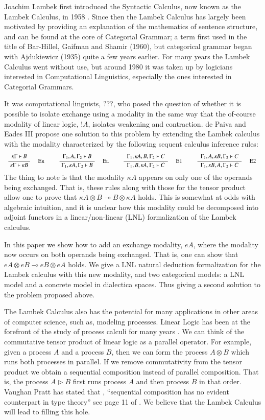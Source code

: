 Joachim Lambek first introduced the Syntactic Calculus, now known as
the Lambek Calculus, in 1958 \cite{Lambek1958}.  Since then the Lambek
Calculus has largely been motivated by providing an explanation of the
mathematics of sentence structure, and can be found at the core of
Categorial Grammar; a term first used in the title of Bar-Hillel,
Gaifman and Shamir (1960), but categorical grammar began with
Ajdukiewicz (1935) quite a few years earlier. For many years the
Lambek Calculus went without use, but around 1980 it was taken up by
logicians interested in Computational Linguistics, especially the ones
interested in Categorial Grammars.

It was computational linguists, ???, who posed the question of whether
it is possible to isolate exchange using a modality in the same way
that the of-course modality of linear logic, $!A$, isolates weakening
and contraction.  de Paiva and Eades III \cite{dePaiva2018} propose
one solution to this problem by extending the Lambek calculus with the
modality characterized by the following sequent calculus inference
rules:
\[
\small
\begin{array}{ccccccccccccccccccccc}  
  {\displaystyle\frac{\begin{array}{l}   \kappa \Gamma \vdash \mathit{B}  \\ \end{array}}{ \kappa \Gamma \vdash \kappa \mathit{B} }\quad\textsc{ {\textsc{Er}}{} }} & & {\displaystyle\frac{\begin{array}{l}  \Gamma_{{\mathrm{1}}} , \mathit{A} , \Gamma_{{\mathrm{2}}} \vdash \mathit{B}  \\ \end{array}}{ \Gamma_{{\mathrm{1}}} , \kappa \mathit{A} , \Gamma_{{\mathrm{2}}} \vdash \mathit{B} }\quad\textsc{ {\textsc{El}}{} }} & & {\displaystyle\frac{\begin{array}{l}  \Gamma_{{\mathrm{1}}} , \kappa \mathit{A} , \mathit{B} , \Gamma_{{\mathrm{2}}} \vdash \mathit{C}  \\ \end{array}}{ \Gamma_{{\mathrm{1}}} , \mathit{B} , \kappa \mathit{A} , \Gamma_{{\mathrm{2}}} \vdash \mathit{C} }\quad\textsc{ {\textsc{E1}}{} }} & & {\displaystyle\frac{\begin{array}{l}  \Gamma_{{\mathrm{1}}} , \mathit{A} , \kappa \mathit{B} , \Gamma_{{\mathrm{2}}} \vdash \mathit{C}  \\ \end{array}}{ \Gamma_{{\mathrm{1}}} , \kappa \mathit{B} , \mathit{A} , \Gamma_{{\mathrm{2}}} \vdash \mathit{C} }\quad\textsc{ {\textsc{E2}}{} }} 
\end{array}
\]
The thing to note is that the modality $\kappa A$ appears on only one
of the operands being exchanged.  That is, these rules along with
those for the tensor product allow one to prove that $\kappa A \otimes
B \multimap B \otimes \kappa A$ holds.  This is somewhat at odds with
algebraic intuition, and it is unclear how this modality could be
decomposed into adjoint functors in a linear/non-linear (LNL)
formalization of the Lambek calculus.

In this paper we show how to add an exchange modality, $eA$, where the
modality now occurs on both operands being exchanged. That is, one can
show that $eA \otimes eB \multimap eB \otimes eA$ holds.  We give a
LNL natural deduction formalization for the Lambek calculus with this
new modality, and two categorical models: a LNL model and a concrete
model in dialectica spaces.  Thus giving a second solution to the
problem proposed above.

The Lambek Calculus also has the potential for many applications in
other areas of computer science, such as, modeling processes.  Linear
Logic has been at the forefront of the study of process calculi for
many years \cite{HONDA20102223,Pratt:1997,ABRAMSKY19945}. We can think
of the commutative tensor product of linear logic as a parallel
operator.  For example, given a process $A$ and a process $B$, then we
can form the process $A \otimes B$ which runs both processes in
parallel.  If we remove commutativity from the tensor product we
obtain a sequential composition instead of parallel composition.  That
is, the process $A \rhd B$ first runs process $A$ and then process $B$
in that order.  Vaughan Pratt has stated that , ``sequential
composition has no evident counterpart in type theory'' see page 11 of
\cite{Pratt:1997}.  We believe that the Lambek Calculus will lead to
filling this hole.  

